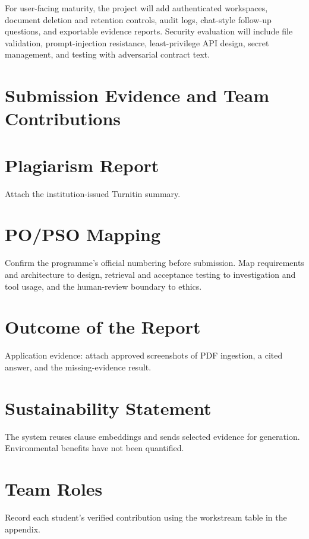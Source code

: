 \documentclass[12pt,a4paper,oneside]{report}
\begin{document}
For user-facing maturity, the project will add authenticated workspaces, document deletion and retention controls, audit logs, chat-style follow-up questions, and exportable evidence reports. Security evaluation will include file validation, prompt-injection resistance, least-privilege API design, secret management, and testing with adversarial contract text.

\section{Submission Evidence and Team Contributions}
\section*{Plagiarism Report}
Attach the institution-issued Turnitin summary.
\section*{PO/PSO Mapping}
Confirm the programme's official numbering before submission. Map requirements and architecture to design, retrieval and acceptance testing to investigation and tool usage, and the human-review boundary to ethics.
\section*{Outcome of the Report}
Application evidence: attach approved screenshots of PDF ingestion, a cited answer, and the missing-evidence result.
\section*{Sustainability Statement}
The system reuses clause embeddings and sends selected evidence for generation. Environmental benefits have not been quantified.
\section*{Team Roles}
Record each student's verified contribution using the workstream table in the appendix.
\end{document}
